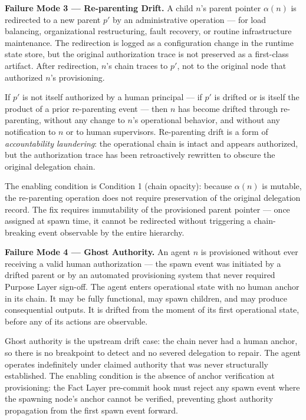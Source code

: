 \medskip
\noindent\textbf{Failure Mode 3 — Re-parenting Drift.}
A child $n$'s parent pointer $\alpha(n)$ is redirected to a new parent $p'$ by an administrative operation — for load balancing, organizational restructuring, fault recovery, or routine infrastructure maintenance. The redirection is logged as a configuration change in the runtime state store, but the original authorization trace is not preserved as a first-class artifact. After redirection, $n$'s chain traces to $p'$, not to the original node that authorized $n$'s provisioning.

If $p'$ is not itself authorized by a human principal — if $p'$ is drifted or is itself the product of a prior re-parenting event — then $n$ has become drifted through re-parenting, without any change to $n$'s operational behavior, and without any notification to $n$ or to human supervisors. Re-parenting drift is a form of \emph{accountability laundering}: the operational chain is intact and appears authorized, but the authorization trace has been retroactively rewritten to obscure the original delegation chain.

The enabling condition is Condition 1 (chain opacity): because $\alpha(n)$ is mutable, the re-parenting operation does not require preservation of the original delegation record. The fix requires immutability of the provisioned parent pointer — once assigned at spawn time, it cannot be redirected without triggering a chain-breaking event observable by the entire hierarchy.

\medskip
\noindent\textbf{Failure Mode 4 — Ghost Authority.}
An agent $n$ is provisioned without ever receiving a valid human authorization — the spawn event was initiated by a drifted parent or by an automated provisioning system that never required Purpose Layer sign-off. The agent enters operational state with no human anchor in its chain. It may be fully functional, may spawn children, and may produce consequential outputs. It is drifted from the moment of its first operational state, before any of its actions are observable.

Ghost authority is the upstream drift case: the chain never had a human anchor, so there is no breakpoint to detect and no severed delegation to repair. The agent operates indefinitely under claimed authority that was never structurally established. The enabling condition is the absence of anchor verification at provisioning: the Fact Layer pre-commit hook must reject any spawn event where the spawning node's anchor cannot be verified, preventing ghost authority propagation from the first spawn event forward.

